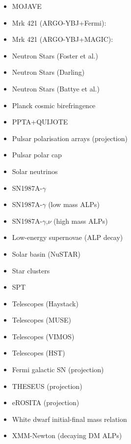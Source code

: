 \documentclass[10pt,twocolumn]{extarticle}
\begin{document}
\begin{mdframed}[everyline=true]
\begin{itemize}
    \item MOJAVE~\cite{Ivanov:2018byi}
    \item Mrk 421 (ARGO-YBJ+Fermi):~\cite{Li:2020pcn}
    \item Mrk 421 (ARGO-YBJ+MAGIC):~\cite{Li:2021gxs}
    \item Neutron Stars (Foster et al.)~\cite{Foster:2020pgt}
    \item Neutron Stars (Darling)~\cite{Darling:2020uyo}
    \item Neutron Stars (Battye et al.)~\cite{Battye:2021yue}
   	\item Planck cosmic birefringence~\cite{Fedderke:2019ajk}
    \item PPTA+QUIJOTE~\cite{Castillo:2022zfl}
    \item Pulsar polarisation arrays (projection)~\cite{Liu:2021zlt}
    \item Pulsar polar cap~\cite{Noordhuis:2022ljw}
    \item Solar neutrinos~\cite{Vinyoles2015}
    \item SN1987A-$\gamma$~\cite{Jaeckel:2017tud}
    \item SN1987A-$\gamma$ (low mass ALPs)~\cite{Payez:2014xsa}
    \item SN1987A-$\gamma$,$\nu$ (high mass ALPs)~\cite{Caputo:2021rux}
    \item Low-energy supernovae (ALP decay)~\cite{Caputo:2022mah}
    \item Solar basin (NuSTAR)~\cite{DeRocco:2022jyq}
    \item Star clusters~\cite{Dessert:2020lil}
    \item SPT~\cite{SPT-3G:2022ods}
    \item Telescopes (Haystack)~\cite{Blout:2000uc}
    \item Telescopes (MUSE)~\cite{Regis:2020fhw}
    \item Telescopes (VIMOS)~\cite{Grin:2006aw}
    \item Telescopes (HST)~\cite{Nakayama:2022jza}
    \item Fermi galactic SN (projection)~\cite{Meyer:2016wrm}
     \item THESEUS (projection)~\cite{Thorpe-Morgan:2020rwc}
    \item eROSITA (projection)~\cite{Dekker:2021bos}
   \item White dwarf initial-final mass relation~\cite{Dolan:2021rya}
   \item XMM-Newton (decaying DM ALPs)~\cite{Foster:2021ngm}
\end{itemize}
\vspace{-2.5em}

\end{mdframed}
\end{document}
